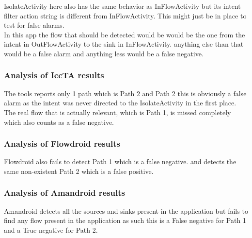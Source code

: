 \documentclass[journal]{IEEEtran}
\begin{document}
IsolateActivity here also has the same behavior as InFlowActivity but its intent filter action string is different from InFlowActivity. This might just be in place to test for false alarms.\\


In this app the flow that should be detected would be would be the one from the intent in OutFlowActivity to the sink in InFlowActivity. anything else than that would be a false alarm and anything less would be a false negative. 

  

\subsubsection{Analysis of IccTA results}
The tools reports only 1 path which is Path 2 and Path 2 this is obviously a false alarm as the intent was never directed to the IsolateActivity in the first place.\\
The real flow that is actually relevant, which is Path 1, is missed completely which also counts as a false negative.


\subsubsection{Analysis of Flowdroid results}
Flowdroid also fails to detect Path 1 which is a false negative. and detects the same non-existent Path 2 which is a false positive.

\subsubsection{Analysis of Amandroid results}
Amandroid detects all the sources and sinks present in the application but fails to find any flow present in the application as such this is a False negative  for Path 1 and a True negative for Path 2.
\end{document}
